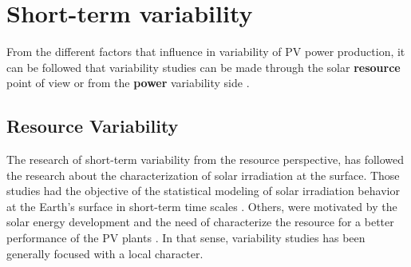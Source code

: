 \section{Short-term variability}%


From the different factors that influence in variability of PV power production, it can be followed that variability studies can be made through the solar \textbf{resource} point of view or from the \textbf{power} variability side \cite*{Widen2015}.

\subsection{Resource Variability}


The research of short-term variability from the resource perspective, has followed the research about the characterization of solar irradiation at the surface. Those studies had the objective of the statistical modeling of solar irradiation behavior at the Earth's surface in short-term time scales \cite*{Liu1960}. Others, were motivated by the solar energy development and the need of characterize the resource for a better performance of the PV plants \cite*{Collares-Pereira1979}. In that sense, variability studies has been generally focused with a local character.

